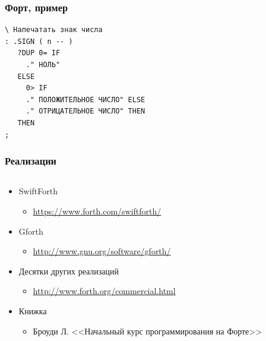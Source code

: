\documentclass{../../slides-style}
\begin{document}
\begin{frame}
\begin{columns}
\begin{column}{0.18\textwidth}
\begin{center}
                \end{center}
            \end{column}
        \end{columns}
    \end{frame}

    \begin{frame}[fragile]
        \frametitle{Форт, пример}
        \begin{verbatim}
\ Напечатать знак числа
: .SIGN ( n -- )
   ?DUP 0= IF
     ." НОЛЬ"
   ELSE
     0> IF
     ." ПОЛОЖИТЕЛЬНОЕ ЧИСЛО" ELSE
     ." ОТРИЦАТЕЛЬНОЕ ЧИСЛО" THEN
   THEN
;
        \end{verbatim}
    \end{frame}

    \begin{frame}
        \frametitle{Реализации}
        \begin{columns}
            \begin{column}{0.8\textwidth}
                \begin{itemize}
                    \item SwiftForth
                    \begin{itemize}
                        \item \url{https://www.forth.com/swiftforth/}
                    \end{itemize}
                    \item Gforth
                    \begin{itemize}
                        \item \url{http://www.gnu.org/software/gforth/}
                    \end{itemize}
                    \item Десятки других реализаций
                    \begin{itemize}
                        \item \url{http://www.forth.org/commercial.html}
                    \end{itemize}
                    \item Книжка
                    \begin{itemize}
                        \item Броуди Л. <<Начальный курс программирования на Форте>>
                    \end{itemize}
                \end{itemize}
            \end{column}

\end{columns}
\end{frame}
\end{document}
